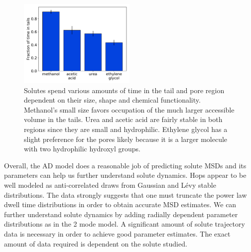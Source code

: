 \documentclass{article}
\begin{document}
  \begin{figure}
  \centering
  \includegraphics[width=0.5\textwidth]{AD_mode_occupation.pdf}
  \caption{Solutes spend various amounts of time in the tail and pore region dependent
  on their size, shape and chemical functionality. Methanol's small size favors 
  occupation of the much larger accessible volume in the tails. Urea and acetic acid
  are fairly stable in both regions since they are small and hydrophilic. Ethylene 
  glycol has a slight preference for the pores likely because it is a larger
  molecule with two hydrophilic hydroxyl groups.}\label{fig:AD_mode_occupation}
  \end{figure}
  
  Overall, the AD model does a reasonable job of predicting solute MSDs and its 
  parameters can help us further understand solute dynamics. Hops appear to be well
  modeled as anti-correlated draws from Gaussian and L\'evy stable distributions. 
  The data strongly suggests that one must truncate the power law dwell time 
  distributions in order to obtain accurate MSD estimates. We can further understand
  solute dynamics by adding radially dependent parameter distributions as in the 
  2 mode model. A significant amount of solute trajectory data is necessary 
  in order to achieve good parameter estimates. The exact amount of data required 
  is dependent on the solute studied. 
  
  
\end{document}
